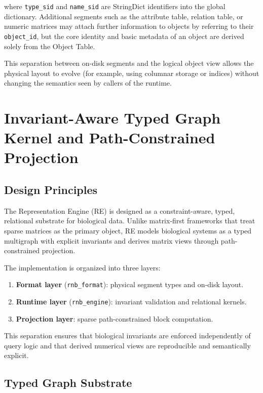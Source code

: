\documentclass[11pt]{article}
\begin{document}
where \verb|type_sid| and \verb|name_sid| are StringDict identifiers
into the global dictionary. Additional segments such as the attribute
table, relation table, or numeric matrices may attach further
information to objects by referring to their \verb|object_id|, but the
core identity and basic metadata of an object are derived solely from
the Object Table.

This separation between on-disk segments and the logical object view
allows the physical layout to evolve (for example, using columnar
storage or indices) without changing the semantics seen by callers of
the runtime.

\section{Invariant-Aware Typed Graph Kernel and Path-Constrained Projection}

\subsection{Design Principles}

The Representation Engine (RE) is designed as a constraint-aware, typed, relational substrate for biological data. Unlike matrix-first frameworks that treat sparse matrices as the primary object, RE models biological systems as a typed multigraph with explicit invariants and derives matrix views through path-constrained projection. 

The implementation is organized into three layers:

\begin{enumerate}
    \item \textbf{Format layer} (\texttt{rnb\_format}): physical segment types and on-disk layout.
    \item \textbf{Runtime layer} (\texttt{rnb\_engine}): invariant validation and relational kernels.
    \item \textbf{Projection layer}: sparse path-constrained block computation.
\end{enumerate}

This separation ensures that biological invariants are enforced independently of query logic and that derived numerical views are reproducible and semantically explicit.

\subsection{Typed Graph Substrate}
\end{document}
